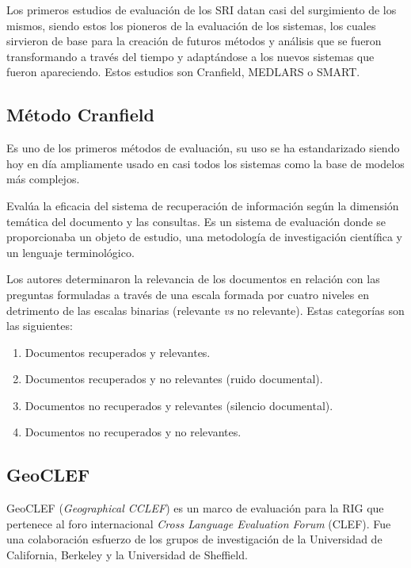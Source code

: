 \documentclass{llncs}
\begin{document}
Los primeros estudios de evaluación de los SRI datan casi del surgimiento de
los mismos, siendo estos los pioneros de la evaluación de los sistemas, los
cuales sirvieron de base para la creación de futuros métodos y análisis que
se fueron transformando a través del tiempo y adaptándose a los nuevos
sistemas que fueron apareciendo. Estos estudios son Cranfield,
MEDLARS o SMART. \cite{bors2000}

\subsection{Método Cranfield}\label{sec:Cranfield}

Es uno de los primeros métodos de evaluación, su uso se ha estandarizado 
siendo hoy en día ampliamente usado en casi todos los sistemas como la base de
modelos más complejos.\cite{hosseini2013}

Evalúa la eficacia del sistema de recuperación de información según la
dimensión temática del documento y las consultas. Es un sistema de evaluación
donde se proporcionaba un objeto de estudio, una metodología de investigación
científica y un lenguaje terminológico.

Los autores determinaron la relevancia de los documentos en relación
con las preguntas formuladas a través de una escala formada por cuatro niveles
en detrimento de las escalas binarias (relevante \emph{vs} no relevante).
Estas categorías son las siguientes: 

\begin{enumerate}
    \item Documentos recuperados y relevantes.
    \item Documentos recuperados y no relevantes (ruido documental).
    \item Documentos no recuperados y relevantes (silencio documental).
    \item Documentos no recuperados y no relevantes. 
\end{enumerate}

\subsection{GeoCLEF}\label{sec:GeoCLEF}

GeoCLEF (\emph{Geographical CCLEF}) es un marco de evaluación para la RIG que
pertenece al foro internacional \emph{Cross Language Evaluation Forum} (CLEF).
Fue una colaboración esfuerzo de los grupos de investigación de la Universidad
de California, Berkeley y la Universidad de Sheffield.
\cite{gey2005,kornai2005}
\end{document}
